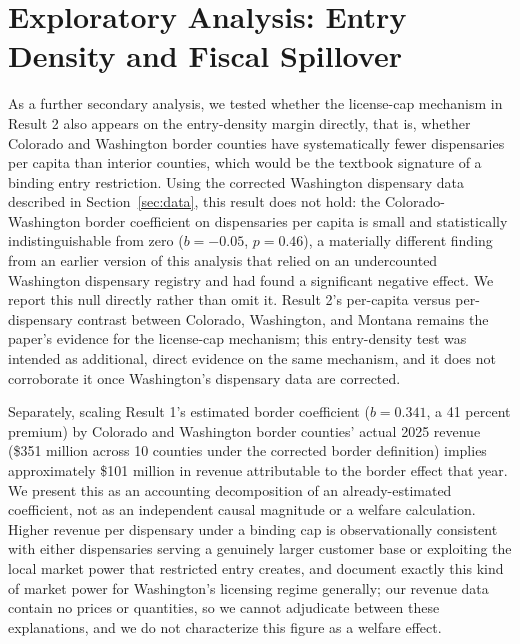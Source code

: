 \documentclass[12pt]{article}
\begin{document}
\section{Exploratory Analysis: Entry Density and Fiscal Spillover}
\label{app:welfare}

As a further secondary analysis, we tested whether the license-cap mechanism in Result 2 also appears on the
entry-density margin directly, that is, whether Colorado and Washington border counties have systematically
fewer dispensaries per capita than interior counties, which would be the textbook signature of a binding
entry restriction. Using the corrected Washington dispensary data described in Section~\ref{sec:data}, this
result does not hold: the Colorado-Washington border coefficient on dispensaries per capita is small and
statistically indistinguishable from zero ($b=-0.05$, $p=0.46$), a materially different finding from an
earlier version of this analysis that relied on an undercounted Washington dispensary registry and had found
a significant negative effect. We report this null directly rather than omit it. Result 2's per-capita
versus per-dispensary contrast between Colorado, Washington, and Montana remains the paper's evidence for the
license-cap mechanism; this entry-density test was intended as additional, direct evidence on the same
mechanism, and it does not corroborate it once Washington's dispensary data are corrected.

Separately, scaling Result 1's estimated border coefficient ($b=0.341$, a 41 percent premium) by Colorado and
Washington border counties' actual 2025 revenue (\$351 million across 10 counties under the corrected border
definition) implies approximately \$101 million in revenue attributable to the border effect that year. We
present this as an accounting decomposition of an already-estimated coefficient, not as an independent
causal magnitude or a welfare calculation. Higher revenue per dispensary under a binding cap is
observationally consistent with either dispensaries serving a genuinely larger customer base or exploiting
the local market power that restricted entry creates, and \citet{HollenbeckUetake2021} document exactly this
kind of market power for Washington's licensing regime generally; our revenue data contain no prices or
quantities, so we cannot adjudicate between these explanations, and we do not characterize this figure as a
welfare effect.
\end{document}
